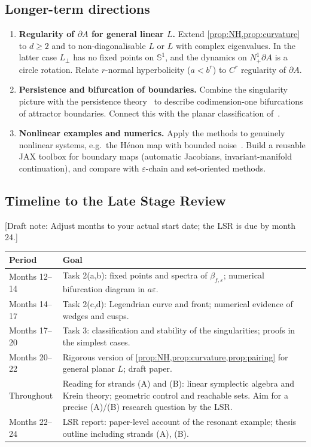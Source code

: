 \documentclass[11pt,a4paper]{article}
\newif\ifdraftnotes \draftnotestrue
\newcommand{\note}[1]{\ifdraftnotes{\color{BrickRed}\textsf{\footnotesize[Draft note: #1]}}\fi}
\theoremstyle{definition}
\theoremstyle{remark}
\newcommand{\eps}{\varepsilon}
\newcommand{\Sph}{\mathbb{S}}
\newcommand{\Nb}{N^1_+\partial A}
\newcommand{\Lperp}{L_\perp}
\begin{document}
\subsection{Longer-term directions}
\begin{enumerate}[leftmargin=*]
  \item \textbf{Regularity of $\partial A$ for general linear $L$.} Extend \cref{prop:NH,prop:curvature} to $d\ge2$ and to
  non-diagonalisable $L$ or $L$ with complex eigenvalues. In the latter case $\Lperp$ has no fixed points on $\Sph^1$, and the
  dynamics on $\Nb$ is a circle rotation. Relate $r$-normal hyperbolicity ($a<b^r$) to $C^r$ regularity of $\partial A$.
  \item \textbf{Persistence and bifurcation of boundaries.} Combine the singularity picture with the persistence
  theory~\cite{KLRTTT23} to describe codimension-one bifurcations of attractor boundaries. Connect this with the planar
  classification of~\cite{LRTi20a,LRTi20b}.
  \item \textbf{Nonlinear examples and numerics.} Apply the methods to genuinely nonlinear systems, e.g.\ the H\'enon map
  with bounded noise~\cite{LRT25}. Build a reusable JAX toolbox for boundary maps (automatic Jacobians, invariant-manifold
  continuation), and compare with $\eps$-chain and set-oriented methods.
\end{enumerate}

\subsection{Timeline to the Late Stage Review}
\note{Adjust months to your actual start date; the LSR is due by month 24.}
\begin{center}
\small
\begin{tabular}{@{}lp{}@{}}
\toprule
Period & Goal\\
\midrule
Months 12--14 & Task 2(a,b): fixed points and spectra of $\beta_{f,\eps}$; numerical bifurcation diagram in $a\eps$.\\
Months 14--17 & Task 2(c,d): Legendrian curve and front; numerical evidence of wedges and cusps.\\
Months 17--20 & Task 3: classification and stability of the singularities; proofs in the simplest cases.\\
Months 20--22 & Rigorous version of \cref{prop:NH,prop:curvature,prop:pairing} for general planar $L$; draft paper.\\
Throughout & Reading for strands (A) and (B): linear symplectic algebra and Krein theory; geometric control and
reachable sets. Aim for a precise (A)/(B) research question by the LSR.\\
Months 22--24 & LSR report: paper-level account of the resonant example; thesis outline including strands (A), (B).\\
\bottomrule
\end{tabular}
\end{center}
\end{document}
